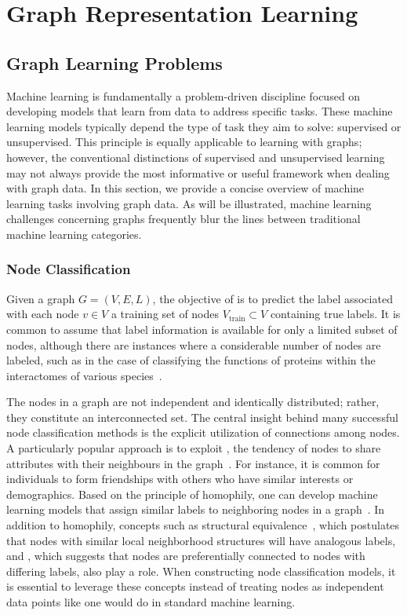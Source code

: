 \chapter{Graph Representation Learning}\label{grl}

\section{Graph Learning Problems}
Machine learning is fundamentally a problem-driven discipline focused on developing models that learn from data to address specific tasks. These machine learning models typically depend the type of task they aim to solve: supervised or unsupervised. This principle is equally applicable to learning with graphs; however, the conventional distinctions of supervised and unsupervised learning may not always provide the most informative or useful framework when dealing with graph data. In this section, we provide a concise overview of machine learning tasks involving graph data. As will be illustrated, machine learning challenges concerning graphs frequently blur the lines between traditional machine learning categories.

\subsection{Node Classification}
Given a graph $ G = (V,E,L) $, the objective of  is to predict the label associated with each node $ v \in V $ a training set of nodes $ V_\text{train} \subset V $ containing true labels. It is common to assume that label information is available for only a limited subset of nodes, although there are instances where a considerable number of nodes are labeled, such as in the case of classifying the functions of proteins within the interactomes of various species~\cite{Hamilton2017inductiveRepresentationLearning}.

The nodes in a graph are not independent and identically distributed; rather, they constitute an interconnected set. The central insight behind many successful node classification methods is the explicit utilization of connections among nodes. A particularly popular approach is to exploit , the tendency of nodes to share attributes with their neighbours in the graph~\cite{Mcpherson2001homophilyInSocialNw}. For instance, it is common for individuals to form friendships with others who have similar interests or demographics. Based on the principle of homophily, one can develop machine learning models that assign similar labels to neighboring nodes in a graph~\cite{Zhou2003LearningLocalGlobalConsistency}. In addition to homophily, concepts such as structural equivalence~\cite{Donnat2017GraphWaveletsStructuralRoleSimilarityComplexNws}, which postulates that nodes with similar local neighborhood structures will have analogous labels, and , which suggests that nodes are preferentially connected to nodes with differing labels, also play a role. When constructing node classification models, it is essential to leverage these concepts instead of treating nodes as independent data points like one would do in standard machine learning.

